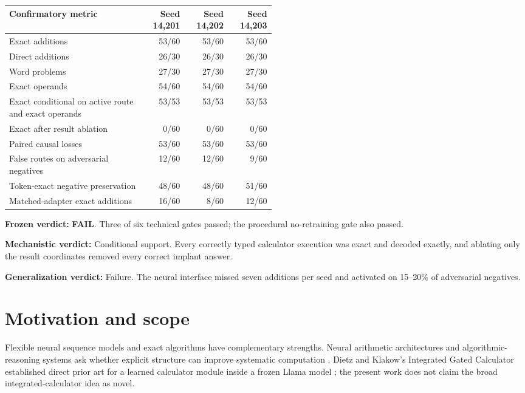 \documentclass[11pt]{article}
\newcommand{\fail}{\textcolor{failred}{\textbf{FAIL}}}
\begin{document}
\begin{center}
\small
\begin{tabular}{p{0.51\linewidth}rrr}
\toprule
Confirmatory metric & Seed 14,201 & Seed 14,202 & Seed 14,203\\
\midrule
Exact additions & 53/60 & 53/60 & 53/60\\
Direct additions & 26/30 & 26/30 & 26/30\\
Word problems & 27/30 & 27/30 & 27/30\\
Exact operands & 54/60 & 54/60 & 54/60\\
Exact conditional on active route and exact operands
  & 53/53 & 53/53 & 53/53\\
Exact after result ablation & 0/60 & 0/60 & 0/60\\
Paired causal losses & 53/60 & 53/60 & 53/60\\
False routes on adversarial negatives & 12/60 & 12/60 & 9/60\\
Token-exact negative preservation & 48/60 & 48/60 & 51/60\\
Matched-adapter exact additions & 16/60 & 8/60 & 12/60\\
\bottomrule
\end{tabular}
\end{center}

\noindent\textbf{Frozen verdict:} \fail. Three of six technical gates passed;
the procedural no-retraining gate also passed.

\medskip
\noindent\textbf{Mechanistic verdict:} Conditional support. Every correctly
typed calculator execution was exact and decoded exactly, and ablating only
the result coordinates removed every correct implant answer.

\medskip
\noindent\textbf{Generalization verdict:} Failure. The neural interface missed
seven additions per seed and activated on 15--20\% of adversarial negatives.

\section{Motivation and scope}

Flexible neural sequence models and exact algorithms have complementary
strengths. Neural arithmetic architectures and algorithmic-reasoning systems
ask whether explicit structure can improve systematic computation
\cite{trask2018,lindner2023,bounsi2024}. Dietz and Klakow's Integrated Gated
Calculator established direct prior art for a learned calculator module inside
a frozen Llama model \cite{dietz2025}; the present work does not claim the
broad integrated-calculator idea as novel.
\end{document}
